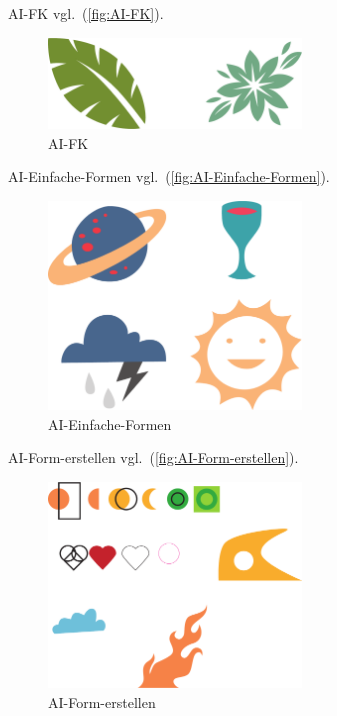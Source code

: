 AI-FK vgl.~(\autoref{fig:AI-FK}).

\begin{figure}[!hb]%
\centering
\includegraphics[width=0.6\textwidth]{Grafiken/AI-FK.pdf}
\caption{AI-FK}
\label{fig:AI-FK}%
\end{figure}

AI-Einfache-Formen vgl.~(\autoref{fig:AI-Einfache-Formen}).

\begin{figure}[!hb]%
\centering
\includegraphics[width=0.6\textwidth]{Grafiken/AI-Einfache-Formen.pdf}
\caption{AI-Einfache-Formen}
\label{fig:AI-Einfache-Formen}%
\end{figure}


AI-Form-erstellen vgl.~(\autoref{fig:AI-Form-erstellen}).

\begin{figure}[!hb]%
\centering
\includegraphics[width=0.6\textwidth]{Grafiken/AI-Form-erstellen.pdf}
\caption{AI-Form-erstellen}
\label{fig:AI-Form-erstellen}%
\end{figure}

